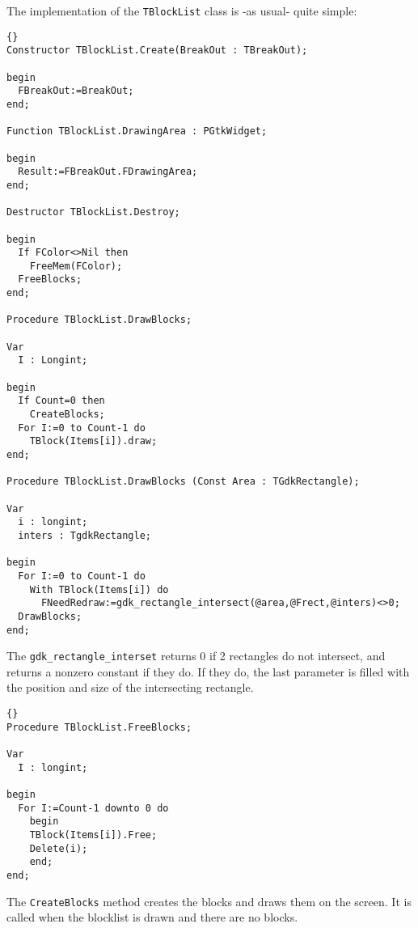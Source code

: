 \documentclass[10pt]{article}
\newcommand{\var}[1]{\texttt{#1}}
\begin{document}
The implementation of the \var{TBlockList} class is -as usual- quite simple:
\begin{lstlisting}{}
Constructor TBlockList.Create(BreakOut : TBreakOut);

begin
  FBreakOut:=BreakOut;
end;

Function TBlockList.DrawingArea : PGtkWidget;

begin
  Result:=FBreakOut.FDrawingArea;
end;

Destructor TBlockList.Destroy; 

begin
  If FColor<>Nil then
    FreeMem(FColor);
  FreeBlocks;
end;

Procedure TBlockList.DrawBlocks;

Var
  I : Longint; 

begin
  If Count=0 then
    CreateBlocks;
  For I:=0 to Count-1 do
    TBlock(Items[i]).draw;
end;

Procedure TBlockList.DrawBlocks (Const Area : TGdkRectangle);

Var
  i : longint;
  inters : TgdkRectangle;

begin
  For I:=0 to Count-1 do
    With TBlock(Items[i]) do
      FNeedRedraw:=gdk_rectangle_intersect(@area,@Frect,@inters)<>0;
  DrawBlocks;    
end;
\end{lstlisting}
The \var{gdk\_rectangle\_interset} returns 0 if 2 rectangles do not intersect,
and returns a nonzero constant if they do. If they do, the last parameter
is filled with the position and size of the intersecting rectangle.

\begin{lstlisting}{}
Procedure TBlockList.FreeBlocks;

Var
  I : longint;

begin
  For I:=Count-1 downto 0 do
    begin
    TBlock(Items[i]).Free;
    Delete(i);
    end;
end;
\end{lstlisting}
The \var{CreateBlocks} method creates the blocks and draws them on the screen.
It is called when the blocklist is drawn and there are no blocks.
\end{document}
